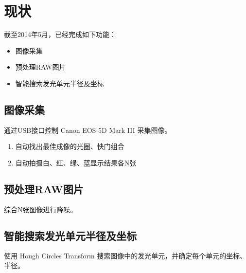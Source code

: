 \section{现状}\label{status}

截至2014年5月，已经完成如下功能：

\begin{itemize}
    \item 图像采集
    \item 预处理RAW图片
    \item 智能搜索发光单元半径及坐标
\end{itemize}

\subsection{图像采集}\label{capture}

通过USB接口控制 Canon EOS 5D Mark III 采集图像。

\begin{enumerate}
    \item 自动找出最佳成像的光圈、快门组合
    \item 自动拍摄白、红、绿、蓝显示结果各N张
\end{enumerate}

\subsection{预处理RAW图片}\label{preprocess}

综合N张图像进行降噪。

\subsection{智能搜索发光单元半径及坐标}\label{search_pixel}

使用 Hough Circles Transform 搜索图像中的发光单元，并确定每个单元的坐标、半径。

\clearpage
